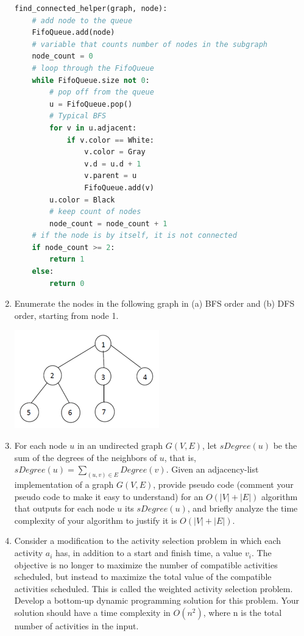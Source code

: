\documentclass{article}
\begin{document}
\begin{enumerate}
\begin{lstlisting}[language=python]
find_connected_helper(graph, node):
    # add node to the queue
    FifoQueue.add(node)
    # variable that counts number of nodes in the subgraph
    node_count = 0
    # loop through the FifoQueue
    while FifoQueue.size not 0:
        # pop off from the queue
        u = FifoQueue.pop()
        # Typical BFS 
        for v in u.adjacent:
            if v.color == White:
                v.color = Gray
                v.d = u.d + 1
                v.parent = u
                FifoQueue.add(v)
        u.color = Black
        # keep count of nodes
        node_count = node_count + 1
    # if the node is by itself, it is not connected
    if node_count >= 2:
        return 1
    else:
        return 0
            \end{lstlisting}
        \item Enumerate the nodes in the following graph in (a) BFS order and 
        (b) DFS order, starting from node 1. 
            \begin{center}
                \includegraphics{tree1}
            \end{center}
        \item For each node $u$ in an undirected graph $G(V, E)$, let 
        $sDegree(u)$ be the sum of the degrees of the neighbors of $u$, that 
        is, $sDegree(u) = \sum_{(u,v)\in E}Degree(v)$. Given an adjacency-list 
        implementation of a graph $G(V, E)$, provide pseudo code (comment your 
        pseudo code to make it easy to understand) for an $O(|V|+|E|)$ 
        algorithm that outputs for each node $u$ its $sDegree(u)$, and briefly 
        analyze the time complexity of your algorithm to justify it is 
        $O(|V|+|E|)$.
        \item Consider a modification to the activity selection problem in 
        which each activity $a_i$ has, in addition to a start and finish time, 
        a value $v_i$. The objective is no longer to maximize the number of 
        compatible activities scheduled, but instead to maximize the total 
        value of the compatible activities scheduled. This is called the 
        weighted activity selection problem. Develop a bottom-up dynamic 
        programming solution for this problem. Your solution should have a 
        time complexity in $O(n^2)$, where n is the total number of activities 
        in the input.
    \end{enumerate}
\end{document}
